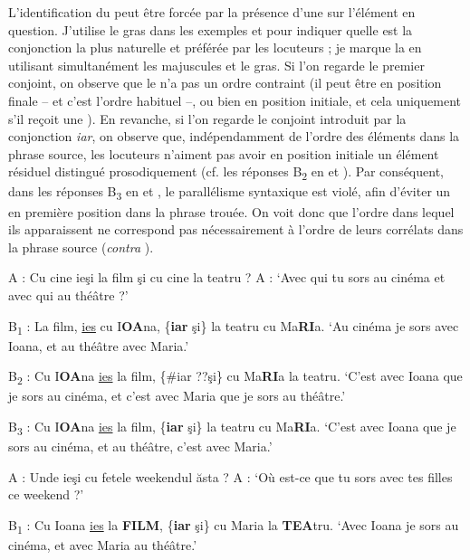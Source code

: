 L’identification du  peut être forcée par la présence d’une  sur l’élément en question. J’utilise le gras dans les exemples  et  pour indiquer quelle est la conjonction la plus naturelle et préférée par les locuteurs ; je marque la  en utilisant simultanément les majuscules et le gras. Si l’on regarde le premier conjoint, on observe que le  n’a pas un ordre contraint (il peut être en position finale – et c’est l’ordre habituel –, ou bien en position initiale, et cela uniquement s’il reçoit une ). En revanche, si l’on regarde le conjoint introduit par la conjonction \textit{iar}, on observe que, indépendamment de l’ordre des éléments dans la phrase source, les locuteurs n’aiment pas avoir en position initiale un élément résiduel distingué prosodiquement (cf. les réponses B\textsubscript{2} en  et ). Par conséquent, dans les réponses B\textsubscript{3} en  et , le parallélisme syntaxique est violé, afin d’éviter un  en première position dans la phrase trouée. On voit donc que l’ordre dans lequel ils apparaissent ne correspond pas nécessairement à l’ordre de leurs corrélats dans la phrase source (\textit{contra} \citealt{KonietzkoEtAl2010}).  

\ea \label{ch2:ex181}
A : Cu cine ieşi la film şi cu cine la teatru ?
\glt A : ‘Avec qui tu sors au cinéma et avec qui au théâtre ?’

\ea B\textsubscript{1} : La film, \uline{ies} cu I\textbf{OA}na, \{\textbf{iar} {\textbar} şi\} la teatru cu Ma\textbf{RI}a. 
\glt ‘Au cinéma je sors avec Ioana, et au théâtre avec Maria.’

\ex B\textsubscript{2} : Cu I\textbf{OA}na \uline{ies} la film, \{\#iar {\textbar} ??şi\} cu Ma\textbf{RI}a la teatru. \label{ch2:ex181b}
\glt ‘C’est avec Ioana que je sors au cinéma, et c’est avec Maria que je sors au théâtre.’

\ex B\textsubscript{3} : Cu I\textbf{OA}na \uline{ies} la film, \{\textbf{iar} {\textbar} şi\} la teatru cu Ma\textbf{RI}a. \label{ch2:ex181c} 
\glt ‘C’est avec Ioana que je sors au cinéma, et au théâtre, c’est avec Maria.’      
\z
\z

\ea \label{ch2:ex182}
A : Unde ieşi cu fetele weekendul ăsta ?
\glt A : ‘Où est-ce que tu sors avec tes filles ce weekend ?’

\ea B\textsubscript{1} : Cu Ioana \uline{ies} la \textbf{FILM}, \{\textbf{iar} {\textbar} şi\} cu Maria la \textbf{TEA}tru. 
\glt ‘Avec Ioana je sors au cinéma, et avec Maria au théâtre.’

